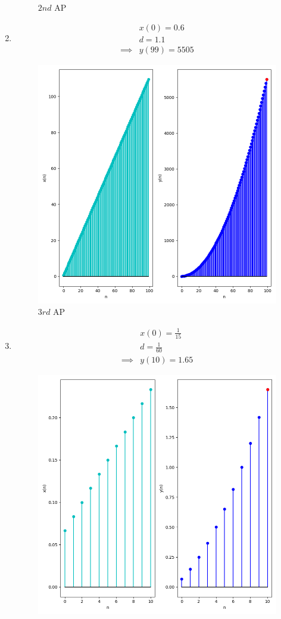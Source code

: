 \documentclass[journal,12pt,twocolumn]{IEEEtran}
\theoremstyle{remark}
\begin{document}
\begin{enumerate}[label=(\alph*)]
\begin{figure}[h!]
        \caption{$2nd$ AP}
    \end{figure}
    \item \begin{align}
        &x(0)=0.6 \\
        &d=1.1 \\
        \implies &y(99)=5505
    \end{align}
    \begin{figure}[h!]
        \centering
        \includegraphics[width=0.9\columnwidth]{figs/plt3.png}
        \caption{$3rd$ AP}
    \end{figure}
    \item \begin{align}
        &x(0)=\frac{1}{15} \\
        &d=\frac{1}{60} \\
        \implies &y(10)=1.65
    \end{align}
    \begin{figure}[h!]
        \centering
        \includegraphics[width=0.9\columnwidth]{figs/plt4.png}

\end{figure}
\end{enumerate}
\end{document}
